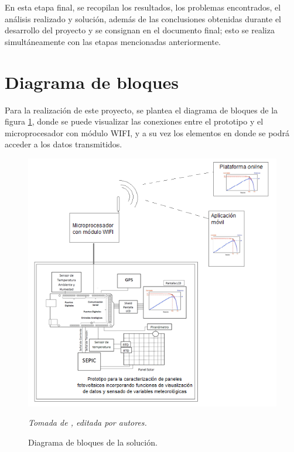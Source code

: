 En esta etapa final, se recopilan los resultados, los problemas encontrados, el análisis realizado y solución, además de las conclusiones obtenidas durante el desarrollo del proyecto y se consignan en el documento final; esto se realiza simultáneamente con las etapas mencionadas anteriormente.

\section{Diagrama de bloques}

Para la realización de este proyecto, se plantea el diagrama de bloques de la figura \ref{fig:bloques}, donde se puede visualizar las conexiones entre el prototipo y el microprocesador con módulo WIFI, y a su vez los elementos en donde se podrá acceder a los datos transmitidos.

\begin{figure}[ht!]
\begin{centering}
\includegraphics [trim = 0mm 0mm 0mm 0mm, clip,angle=0,scale=0.65]{Images/bloques}%
\caption{\label{fig:bloques}Diagrama de bloques de la solución.}
\textit{Tomada de \cite{Proto}, editada por autores.} 
\par\end{centering}
\end{figure}

